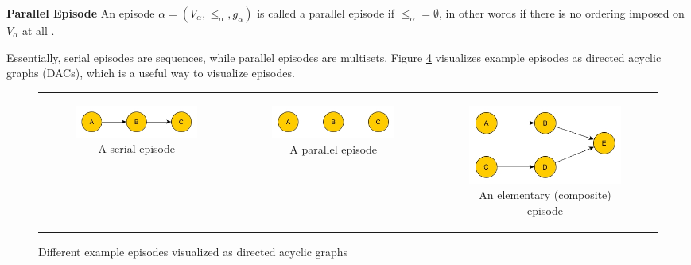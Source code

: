 \begin{mydef}
\textbf{Parallel Episode} An episode $\alpha = (V_\alpha,{\leq}_{\alpha},g_\alpha)$ is called a parallel episode if ${\leq}_{\alpha} = \emptyset$, in other words if there is no ordering imposed on $V_\alpha$ at all \cite{mannila1995discovering}.
\end{mydef}

Essentially, serial episodes are sequences, while parallel episodes are multisets. Figure \ref{fig_exampleEpisodes} visualizes example episodes as directed acyclic graphs (DACs), which is a useful way to visualize episodes. 


\begin{figure}[H]
\centering
\begin{tabular}{c|c|c}
\begin{subfigure}{.3\textwidth}
  \centering
  \includegraphics[width=\linewidth]{exampleSerialEpisode}
  \caption{A serial episode}
  \label{fig:sub1}
\end{subfigure}%
&
\begin{subfigure}{.3\textwidth}
  \centering
  \includegraphics[width=\linewidth]{exampleParallelEpisode}
  \caption{A parallel episode}
  \label{fig:sub2}
\end{subfigure}
&
\begin{subfigure}{.3\textwidth}
  \centering
  \includegraphics[width=\linewidth]{exampleCompositeEpisode}
  \caption{An elementary (composite) episode}
  \label{fig:sub3}
\end{subfigure}
\end{tabular}
\caption{Different example episodes visualized as directed acyclic graphs}
\label{fig_exampleEpisodes}

\end{figure}

